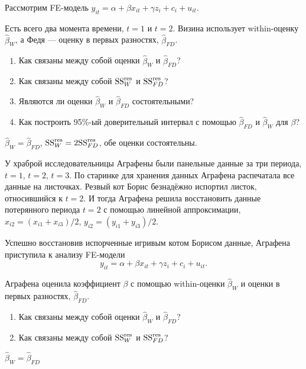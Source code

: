 \begin{problem}
Рассмотрим FE-модель $y_{it} = \alpha + \beta x_{it} + \gamma z_i + c_i + u_{it}$.

Есть всего два момента времени, $t=1$ и $t=2$. Визина использует within-оценку $\hat \beta_{W}$,
а Федя — оценку в первых разностях, $\hat \beta_{FD}$.

\begin{enumerate}
\item Как связаны между собой оценки $\hat \beta_W$ и $\hat \beta_{FD}$?
\item Как связаны между собой $\mathrm{SS}^{\text{res}}_W$ и $\mathrm{SS}^{\text{res}}_{FD}$?
\item Являются ли оценки $\hat\beta_W$ и $\hat\beta_{FD}$ состоятельными?
\item Как построить 95\%-ый доверительный интервал с помощью $\hat\beta_{FD}$ и $\hat\beta_W$ для $\beta$?
\end{enumerate}


\begin{sol}
$\hat\beta_W = \hat\beta_{FD}$, $\mathrm{SS}^{\text{res}}_W = 2\mathrm{SS}^{\text{res}}_{FD}$, обе оценки состоятельны.
\end{sol}
\end{problem}

\begin{problem}
У храброй исследовательницы Аграфены были панельные данные за три периода, $t=1$, $t=2$, $t=3$.
По старинке для хранения данных Аграфена распечатала все данные на листочках.
Резвый кот Борис безнадёжно испортил листок, относившийся к $t=2$. И тогда Аграфена
решила восстановить данные потерянного периода $t=2$ с помощью линейной аппроксимации, $x_{i2} = (x_{i1} + x_{i3})/2$,
$y_{i2} = (y_{i1} + y_{i3})/2$.

Успешно восстановив испорченные игривым котом Борисом данные, Аграфена приступила к анализу FE-модели
\[
y_{it} = \alpha + \beta x_{it} + \gamma z_i + c_i + u_{it}.
\]

Аграфена оценила коэффициент $\beta$ с помощью within-оценки $\hat\beta_{W}$ и
оценки в первых разностях, $\hat\beta_{FD}$.

\begin{enumerate}
\item Как связаны между собой оценки $\hat \beta_W$ и $\hat \beta_{FD}$?
\item Как связаны между собой $\mathrm{SS}^{\text{res}}_W$ и $\mathrm{SS}^{\text{res}}_{FD}$?
\end{enumerate}

\begin{sol}
    $\hat\beta_W = \hat\beta_{FD}$
\end{sol}
\end{problem}



